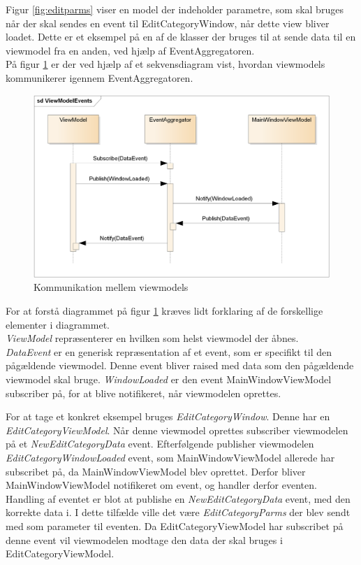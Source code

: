 Figur \ref{fig:editparms} viser en model der indeholder parametre, som skal bruges når der skal sendes en event til EditCategoryWindow, når dette view bliver loadet. Dette er et eksempel på en af de klasser der bruges til at sende data til en viewmodel fra en anden, ved hjælp af EventAggregatoren.\\

På figur \ref{fig:viewmodelcomm} er der ved hjælp af et sekvensdiagram vist, hvordan viewmodels kommunikerer igennem EventAggregatoren.

\begin{figure}[H]
	\centering
	\includegraphics[width=1\textwidth]{Systemdesign/backend/Images/ViewModelEvents}
	\caption{Kommunikation mellem viewmodels}
	\label{fig:viewmodelcomm}
\end{figure}

For at forstå diagrammet på figur \ref{fig:viewmodelcomm} kræves lidt forklaring af de forskellige elementer i diagrammet.\\
\textit{ViewModel} repræsenterer en hvilken som helst viewmodel der åbnes.\\
\textit{DataEvent} er en generisk repræsentation af et event, som er specifikt til den pågældende viewmodel. Denne event bliver raised med data som den pågældende viewmodel skal bruge.
\textit{WindowLoaded} er den event MainWindowViewModel subscriber på, for at blive notifikeret, når viewmodelen oprettes.

For at tage et konkret eksempel bruges \textit{EditCategoryWindow}. Denne har en \textit{EditCategoryViewModel}. Når denne viewmodel oprettes subscriber viewmodelen på et \textit{NewEditCategoryData} event. Efterfølgende publisher viewmodelen \textit{EditCategoryWindowLoaded} event, som MainWindowViewModel allerede har subscribet på, da MainWindowViewModel blev oprettet. Derfor bliver MainWindowViewModel notifikeret om event, og handler derfor eventen. Handling af eventet er blot at publishe en \textit{NewEditCategoryData} event, med den korrekte data i. I dette tilfælde ville det være \textit{EditCategoryParms} der blev sendt med som parameter til eventen. Da EditCategoryViewModel har subscribet på denne event vil viewmodelen modtage den data der skal bruges i EditCategoryViewModel.